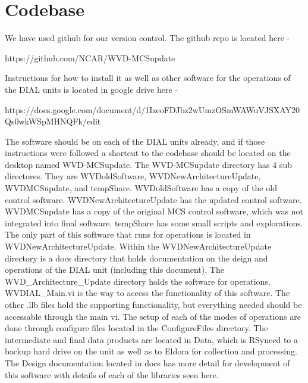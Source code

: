
\chapter{Codebase}
\label{CH-Codebase}

We have used github for our version control. The github repo is located here - 

https://github.com/NCAR/WVD-MCSupdate

\noindent Instructions for how to install it as well as other software for the operations of the DIAL units is located in google drive here - 

https://docs.google.com/document/d/1IzeoFDJbz2wUmzOSmWAWuVJSXAY20Qs0wkWSpMHNQFk/edit

\noindent The software should be on each of the DIAL units already, and if those instructions were followed a shortcut to the codebase should be located on the desktop named WVD-MCSupdate. The WVD-MCSupdate directory has 4 sub directores. They are WVDoldSoftware, WVDNewArchitectureUpdate, WVDMCSupdate, and tempShare. WVDoldSoftware has a copy of the old control software. WVDNewArchitectureUpdate has the updated control software. WVDMCSupdate has a copy of the original MCS control software, which was not integrated into final software. tempShare has some small scripts and explorations. The only part of this software that runs for operations is located in WVDNewArchitectureUpdate. Within the WVDNewArchitectureUpdate directory is a docs directory that holds documentation on the deign and operations of the DIAL unit (including this document). The WVD\_Architecture\_Update directory holds the software for operations. WVDIAL\_Main.vi is the way to access the functionality of this software. The other .llb files hold the supporting functionality, but everything needed should be accessable through the main vi. The setup of each of the modes of operations are done through configure files located in the ConfigureFiles directory. The intermediate and final data products are located in Data, which is RSynced to a backup hard drive on the unit as well as to Eldora for collection and processing. The Design documentation located in docs has more detail for development of this software with details of each of the libraries seen here. 


